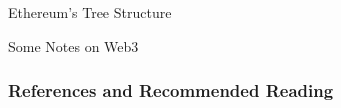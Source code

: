 \documentclass[handout]{beamer}
\begin{document}
\begin{frame}{Ethereum’s Tree Structure}
\vspace{1em}
\end{frame}

\begin{frame}{Some Notes on Web3}
	\begin{figure}
		
	\end{figure}
\end{frame}


\begin{frame}%
\frametitle{References and Recommended Reading}
	
	
\end{frame}
\end{document}
